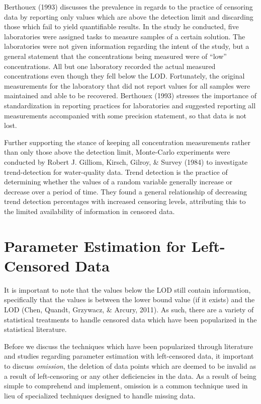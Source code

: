 \documentclass[12pt, twoside]{amherstthesis}
\begin{document}
Berthouex (1993) discusses the prevalence in regards to the practice of censoring data by reporting only values which are above the detection limit and discarding those which fail to yield quantifiable results. In the study he conducted, five laboratories were assigned tasks to measure samples of a certain solution. The laboratories were not given information regarding the intent of the study, but a general statement that the concentrations being measured were of ``low'' concentrations. All but one laboratory recorded the actual measured concentrations even though they fell below the LOD. Fortunately, the original measurements for the laboratory that did not report values for all samples were maintained and able to be recovered. Berthouex (1993) stresses the importance of standardization in reporting practices for laboratories and suggested reporting all measurements accompanied with some precision statement, so that data is not lost.

Further supporting the stance of keeping all concentration measurements rather than only those above the detection limit, Monte-Carlo experiments were conducted by Robert J. Gilliom, Kirsch, Gilroy, \& Survey (1984) to investigate trend-detection for water-quality data. Trend detection is the practice of determining whether the values of a random variable generally increase or decrease over a period of time. They found a general relationship of decreasing trend detection percentages with increased censoring levels, attributing this to the limited availability of information in censored data.

\hypertarget{Approaches}{%
\section{Parameter Estimation for Left-Censored Data}\label{Approaches}}

It is important to note that the values below the LOD still contain information, specifically that the values is between the lower bound value (if it exists) and the LOD (Chen, Quandt, Grzywacz, \& Arcury, 2011). As such, there are a variety of statistical treatments to handle censored data which have been popularized in the statistical literature.

Before we discuss the techniques which have been popularized through literature and studies regarding parameter estimation with left-censored data, it important to discuss \emph{omission}, the deletion of data points which are deemed to be invalid as a result of left-censoring or any other deficiencies in the data. As a result of being simple to comprehend and implement, omission is a common technique used in lieu of specialized techniques designed to handle missing data.
\end{document}
